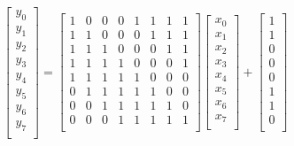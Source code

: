 \[
  \begin{bmatrix}
      y_{0} \\
      y_{1} \\
      y_{2} \\
      y_{3} \\
      y_{4} \\
      y_{5} \\
      y_{6} \\
      y_{7} \\
  \end{bmatrix}
  =
  \begin{bmatrix}
      1 & 0 & 0 & 0 & 1 & 1 & 1 & 1 \\
      1 & 1 & 0 & 0 & 0 & 1 & 1 & 1 \\
      1 & 1 & 1 & 0 & 0 & 0 & 1 & 1 \\
      1 & 1 & 1 & 1 & 0 & 0 & 0 & 1 \\
      1 & 1 & 1 & 1 & 1 & 0 & 0 & 0 \\
      0 & 1 & 1 & 1 & 1 & 1 & 0 & 0 \\
      0 & 0 & 1 & 1 & 1 & 1 & 1 & 0 \\
      0 & 0 & 0 & 1 & 1 & 1 & 1 & 1 \\
  \end{bmatrix}
  \begin{bmatrix}
    x_{0} \\
    x_{1} \\
    x_{2} \\
    x_{3} \\
    x_{4} \\
    x_{5} \\
    x_{6} \\
    x_{7} \\
  \end{bmatrix}
  +
  \begin{bmatrix}
    1 \\
    1 \\
    0 \\
    0 \\
    0 \\
    1 \\
    1 \\
    0 \\
  \end{bmatrix}
\]